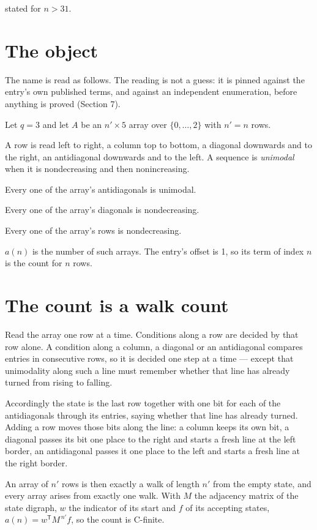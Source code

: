 \documentclass[11pt]{article}
\theoremstyle{definition}
\begin{document}
stated for $n > 31$.

\section{The object}

The name is read as follows. The reading is not a guess: it is pinned against the entry's own published terms, and against an independent enumeration, before anything is proved (Section 7).

Let $q = 3$ and let $A$ be an $n' \times 5$ array over $\{0,\dots,2\}$ with $n' = n$ rows.

A row is read left to right, a column top to bottom, a diagonal downwards and to the right, an antidiagonal downwards and to the left. A sequence is {\itshape unimodal} when it is nondecreasing and then nonincreasing.

Every one of the array's antidiagonals is unimodal.

Every one of the array's diagonals is nondecreasing.

Every one of the array's rows is nondecreasing.

$a(n)$ is the number of such arrays. The entry's offset is 1, so its term of index $n$ is the count for $n$ rows.

\section{The count is a walk count}

Read the array one row at a time. Conditions along a row are decided by that row alone. A condition along a column, a diagonal or an antidiagonal compares entries in consecutive rows, so it is decided one step at a time --- except that unimodality along such a line must remember whether that line has already turned from rising to falling.

Accordingly the state is the last row together with one bit for each of the antidiagonals through its entries, saying whether that line has already turned. Adding a row moves those bits along the line: a column keeps its own bit, a diagonal passes its bit one place to the right and starts a fresh line at the left border, an antidiagonal passes it one place to the left and starts a fresh line at the right border.

An array of $n'$ rows is then exactly a walk of length $n'$ from the empty state, and every array arises from exactly one walk. With $M$ the adjacency matrix of the state digraph, $w$ the indicator of its start and $f$ of its accepting states, $a(n) = w^{\mathsf T}M^{\,n'}f$, so the count is C-finite.
\end{document}
